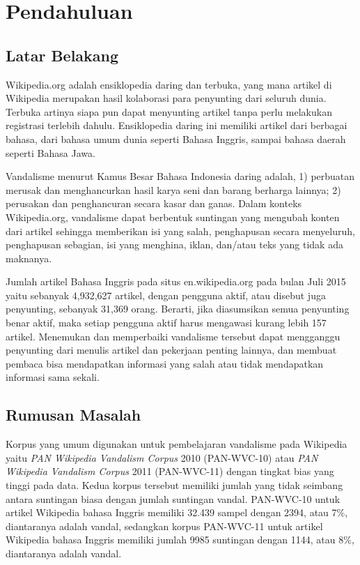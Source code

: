\chapter{Pendahuluan}

\section{Latar Belakang}
\label{sec:latar-belakang}

Wikipedia.org adalah ensiklopedia daring dan terbuka, yang mana artikel di
Wikipedia merupakan hasil kolaborasi para penyunting dari seluruh dunia.
Terbuka artinya siapa pun dapat menyunting artikel tanpa perlu melakukan
registrasi terlebih dahulu.
Ensiklopedia daring ini memiliki artikel dari berbagai bahasa, dari bahasa umum
dunia seperti Bahasa Inggris, sampai bahasa daerah seperti Bahasa Jawa.

Vandalisme menurut Kamus Besar Bahasa Indonesia daring adalah,
1) perbuatan merusak dan menghancurkan hasil karya seni dan barang berharga
lainnya;
2) perusakan dan penghancuran secara kasar dan ganas.
Dalam konteks Wikipedia.org, vandalisme dapat berbentuk suntingan yang mengubah
konten dari artikel sehingga memberikan isi yang salah, penghapusan secara
menyeluruh, penghapusan sebagian, isi yang menghina, iklan, dan/atau teks yang
tidak ada maknanya.

Jumlah artikel Bahasa Inggris pada situs en.wikipedia.org pada bulan Juli 2015
yaitu sebanyak 4,932,627 artikel, dengan pengguna aktif, atau disebut juga
penyunting, sebanyak 31,369 orang.
Berarti, jika diasumsikan semua penyunting benar aktif, maka setiap pengguna
aktif harus mengawasi kurang lebih 157 artikel.
Menemukan dan memperbaiki vandalisme tersebut dapat mengganggu penyunting dari
menulis artikel dan pekerjaan penting lainnya, dan membuat pembaca bisa
mendapatkan informasi yang salah atau tidak mendapatkan informasi sama sekali.


\section{Rumusan Masalah}
\label{sec:rumusan-masalah}

Korpus yang umum digunakan untuk pembelajaran vandalisme pada Wikipedia yaitu
\textit{PAN Wikipedia Vandalism Corpus} 2010 (PAN-WVC-10)
\cite{potthast:2010b}
atau
\textit{PAN Wikipedia Vandalism Corpus} 2011 (PAN-WVC-11)
\cite{potthast:2010b}
dengan tingkat bias yang tinggi pada data.
Kedua korpus tersebut memiliki jumlah yang tidak seimbang antara suntingan
biasa dengan jumlah suntingan vandal.
PAN-WVC-10 untuk artikel Wikipedia bahasa Inggris memiliki 32.439 sampel dengan
2394, atau 7\%, diantaranya adalah vandal, sedangkan korpus PAN-WVC-11 untuk
artikel Wikipedia bahasa Inggris memiliki jumlah 9985 suntingan dengan 1144,
atau 8\%, diantaranya adalah vandal.

